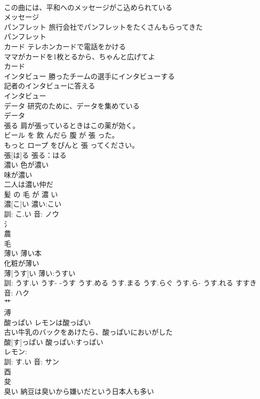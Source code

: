 \documentclass[8pt]{extreport}
\begin{document}
\begin{CJK}{UTF8}{min}
\\	この曲には、平和へのメッセージがこ込められている 
\\	メッセージ			
\\	パンフレット	旅行会社でパンフレットをたくさんもらってきた 
\\	パンフレット			
\\	カード	テレホンカードで電話をかける 
\\	ママがカードを1枚とるから、ちゃんと広げてよ 
\\	カード						
\\	インタビュー	勝ったチームの選手にインタビューする 
\\	記者のインタビューに答える 
\\	インタビュー						
\\	データ	研究のために、データを集めている 
\\	データ						
\\	張る	肩が張っているときはこの薬が効く。 
\\	ビール を 飲 んだら 腹 が 張 った。 
\\	もっと ロープ をぴんと 張 ってください。 
\\	張[は]る			張る：はる
\\	濃い	色が濃い 
\\	味が濃い 
\\	二人は濃い仲だ 
\\	髪 の 毛 が 濃 い 
\\	濃[こ]い			濃い:こい
\\	訓: こ.い 音: ノウ 
\\	氵 
\\	農 
\\	毛 
\\	薄い	薄い本 
\\	化粧が薄い 
\\	薄[うす]い			薄い:うすい
\\	訓: うす.い うす- -うす うす.める うす.まる うす.らぐ うす.ら- うす.れる すすき 音: ハク 
\\	艹 
\\	溥 
\\	酸っぱい	レモンは酸っぱい 
\\	古い牛乳のバックをあけたら、酸っぱいにおいがした 
\\	酸[す]っぱい			酸っぱい:すっぱい
\\	レモン:
\\	訓: す.い 音: サン 
\\	酉 
\\	夋	
\\	臭い	納豆は臭いから嫌いだという日本人も多い 

\end{CJK}
\end{document}
